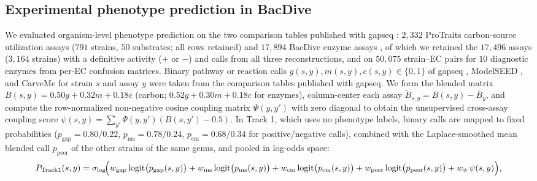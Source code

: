 \documentclass[10pt,twocolumn]{article}
\begin{document}
\subsection{Experimental phenotype prediction in BacDive}
\label{sec:methods_bacdive}

We evaluated organism-level phenotype prediction on the two comparison tables published with gapseq \citep{zimmermann2021gapseq}: $2{,}332$ ProTraits carbon-source utilization assays ($791$ strains, $50$ substrates; all rows retained) and $17{,}894$ BacDive enzyme assays \citep{reimer2022bacdive,schober2025bac}, of which we retained the $17{,}496$ assays ($3{,}164$ strains) with a definitive activity ($+$ or $-$) and calls from all three reconstructions, and on $50{,}075$ strain--EC pairs for $10$ diagnostic enzymes from per-EC confusion matrices. Binary pathway or reaction calls $g(s, y), m(s, y), c(s, y) \in \{0, 1\}$ of gapseq \citep{zimmermann2021gapseq}, ModelSEED \citep{seaver2021modelseed}, and CarveMe \citep{machado2018fast} for strain $s$ and assay $y$ were taken from the comparison tables published with gapseq. We form the blended matrix $B(s, y) = 0.50g + 0.32m + 0.18c$ (carbon; $0.52g + 0.30m + 0.18c$ for enzymes), column-center each assay $\tilde{B}_{s, y} = B(s, y) - \bar{B}_y$, and compute the row-normalized non-negative cosine coupling matrix $\Psi(y, y')$ with zero diagonal to obtain the unsupervised cross-assay coupling score $\psi(s, y) = \sum_{y'} \Psi(y, y')(B(s, y') - 0.5)$. In Track 1, which uses no phenotype labels, binary calls are mapped to fixed probabilities ($p_{\text{gap}} = 0.80/0.22$, $p_{\text{ms}} = 0.78/0.24$, $p_{\text{cm}} = 0.68/0.34$ for positive/negative calls), combined with the Laplace-smoothed mean blended call $p_{\text{peer}}$ of the other strains of the same genus, and pooled in log-odds space:
\begin{equation}
  P_{\text{Track1}}(s, y) = \sigma_{\text{log}}\!\Bigl(w_{\text{gap}}\operatorname{logit}\bigl(p_{\text{gap}}(s, y)\bigr) + w_{\text{ms}}\operatorname{logit}\bigl(p_{\text{ms}}(s, y)\bigr) + w_{\text{cm}}\operatorname{logit}\bigl(p_{\text{cm}}(s, y)\bigr) + w_{\text{peer}}\operatorname{logit}\bigl(p_{\text{peer}}(s, y)\bigr) + w_\psi\,\psi(s, y)\Bigr),
  \label{eq:bacdive_t1}
\end{equation}
\end{document}

